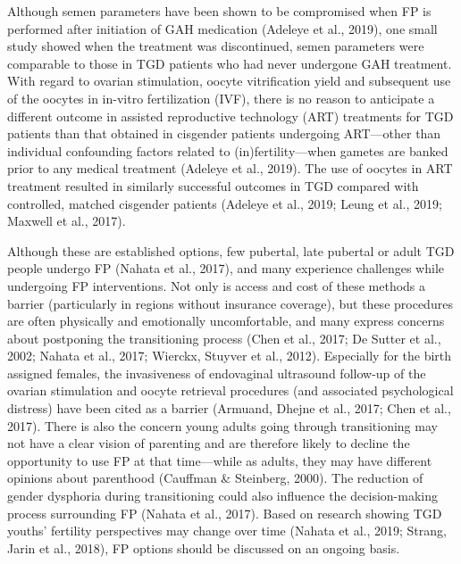 \documentclass[
]{book}
\begin{document}
Although semen parameters have been shown
to be compromised when FP is performed after
initiation of GAH medication (Adeleye et al.,
2019), one small study showed when the treatment was discontinued, semen parameters were
comparable to those in TGD patients who had
never undergone GAH treatment. With regard to
ovarian stimulation, oocyte vitrification yield and
subsequent use of the oocytes in in-vitro fertilization (IVF), there is no reason to anticipate a
different outcome in assisted reproductive technology (ART) treatments for TGD patients than
that obtained in cisgender patients undergoing
ART---other than individual confounding factors
related to (in)fertility---when gametes are banked
prior to any medical treatment (Adeleye et al.,
2019). The use of oocytes in ART treatment
resulted in similarly successful outcomes in TGD
compared with controlled, matched cisgender
patients (Adeleye et al., 2019; Leung et al., 2019;
Maxwell et al., 2017).

Although these are established options, few
pubertal, late pubertal or adult TGD people
undergo FP (Nahata et al., 2017), and many experience challenges while undergoing FP interventions. Not only is access and cost of these
methods a barrier (particularly in regions without
insurance coverage), but these procedures are
often physically and emotionally uncomfortable,
and many express concerns about postponing the
transitioning process (Chen et al., 2017; De Sutter
et al., 2002; Nahata et al., 2017; Wierckx, Stuyver
et al., 2012). Especially for the birth assigned
females, the invasiveness of endovaginal ultrasound follow-up of the ovarian stimulation and
oocyte retrieval procedures (and associated psychological distress) have been cited as a barrier
(Armuand, Dhejne et al., 2017; Chen et al., 2017).
There is also the concern young adults going
through transitioning may not have a clear vision
of parenting and are therefore likely to decline
the opportunity to use FP at that time---while as
adults, they may have different opinions about
parenthood (Cauffman \& Steinberg, 2000). The
reduction of gender dysphoria during transitioning could also influence the decision-making
process surrounding FP (Nahata et al., 2017).
Based on research showing TGD youths' fertility
perspectives may change over time (Nahata et al.,
2019; Strang, Jarin et al., 2018), FP options should
be discussed on an ongoing basis.
\end{document}

